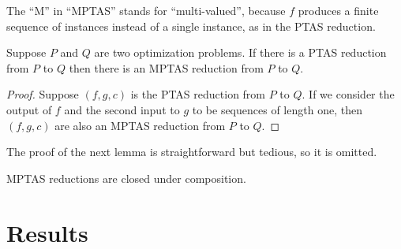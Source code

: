 \documentclass{article}
\begin{document}
The ``M'' in ``MPTAS'' stands for ``multi-valued'', because $f$ produces a finite sequence of instances instead of a single instance, as in the PTAS reduction.

\begin{lemma}\label{lem:ptasimpliesmptas}
  Suppose $P$ and $Q$ are two optimization problems.
  If there is a PTAS reduction from $P$ to $Q$ then there is an MPTAS reduction from $P$ to $Q$.
\end{lemma}
\begin{proof}
  Suppose $(f, g, c)$ is the PTAS reduction from $P$ to $Q$.
  If we consider the output of $f$ and the second input to $g$ to be sequences of length one, then $(f, g, c)$ are also an MPTAS reduction from $P$ to $Q$.
\end{proof}

The proof of the next lemma is straightforward but tedious, so it is omitted.

\begin{lemma}\label{lem:composition}
  MPTAS reductions are closed under composition.
\end{lemma}

\section{Results}
\end{document}
